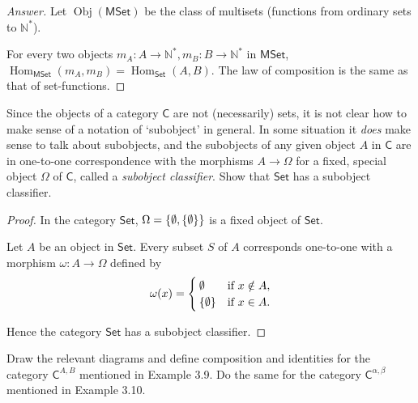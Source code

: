 \begin{proof}[Answer]
	Let $\operatorname{Obj}(\mathsf{MSet})$ be the class of multisets (functions from ordinary sets to $\mathbb{N}^{*}$).

	For every two objects $m_{A}: A\to \mathbb{N}^{*}, m_{B}: B\to \mathbb{N}^{*}$ in $\mathsf{MSet}$, $\operatorname{Hom}_{\mathsf{MSet}}(m_{A}, m_{B}) = \operatorname{Hom}_{\mathsf{Set}}(A, B)$. The law of composition is the same as that of set-functions.
\end{proof}

\begin{exercise}{3.10}
	Since the objects of a category $\mathsf{C}$ are not (necessarily) sets, it is not clear how to make sense of a notation of `subobject' in general. In some situation it \textit{does} make sense to talk about subobjects, and the subobjects of any given object $A$ in $\mathsf{C}$ are in one-to-one correspondence with the morphisms $A\to \Omega$ for a fixed, special object $\Omega$ of $\mathsf{C}$, called a \textit{subobject classifier}. Show that $\mathsf{Set}$ has a subobject classifier.
\end{exercise}

\begin{proof}
	In the category $\mathsf{Set}$, $\Omega = \left\{{\emptyset, \left\{{\emptyset}\right\}}\right\}$ is a fixed object of $\mathsf{Set}$.

	Let $A$ be an object in $\mathsf{Set}$. Every subset $S$ of $A$ corresponds one-to-one with a morphism $\omega: A\to \Omega$ defined by
	\begin{align*}
		\omega(x) = \begin{cases}
			            \emptyset       & \text{if $x\notin A$}, \\
			            \left\{{\emptyset}\right\} & \text{if $x\in A$}.
		            \end{cases}
	\end{align*}

	Hence the category $\mathsf{Set}$ has a subobject classifier.
\end{proof}

\begin{exercise}{3.11}
	Draw the relevant diagrams and define composition and identities for the category ${\mathsf{C}}^{A, B}$ mentioned in Example 3.9. Do the same for the category ${\mathsf{C}}^{\alpha,\beta}$ mentioned in Example 3.10.
\end{exercise}

